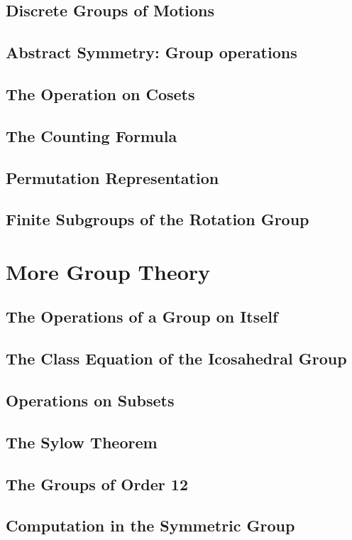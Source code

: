 \documentclass[12pt]{book}
\begin{document}
\section{Discrete Groups of Motions}
\section{Abstract Symmetry: Group operations}
\section{The Operation on Cosets}
\section{The Counting Formula}
\section{Permutation Representation}
\section{Finite Subgroups of the Rotation Group}




\chapter{More Group Theory}

\section{The Operations of a Group on Itself}
\section{The Class Equation of the Icosahedral Group}
\section{Operations on Subsets}
\section{The Sylow Theorem}
\section{The Groups of Order 12}
\section{Computation in the Symmetric Group}
\end{document}
